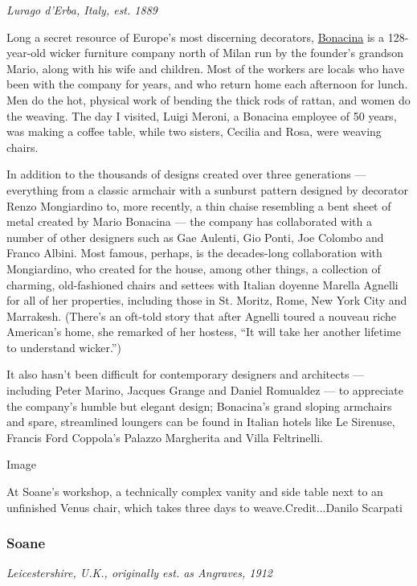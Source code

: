 \emph{Lurago d'Erba, Italy, est. 1889}

Long a secret resource of Europe's most discerning decorators,
\href{http://www.bonacina1889.it/}{Bonacina} is a 128-year-old wicker
furniture company north of Milan run by the founder's grandson Mario,
along with his wife and children. Most of the workers are locals who
have been with the company for years, and who return home each afternoon
for lunch. Men do the hot, physical work of bending the thick rods of
rattan, and women do the weaving. The day I visited, Luigi Meroni, a
Bonacina employee of 50 years, was making a coffee table, while two
sisters, Cecilia and Rosa, were weaving chairs.

In addition to the thousands of designs created over three generations
--- everything from a classic armchair with a sunburst pattern designed
by decorator Renzo Mongiardino to, more recently, a thin chaise
resembling a bent sheet of metal created by Mario Bonacina --- the
company has collaborated with a number of other designers such as Gae
Aulenti, Gio Ponti, Joe Colombo and Franco Albini. Most famous, perhaps,
is the decades-­long collaboration with Mongiardino, who created for the
house, among other things, a collection of charming, old-fashioned
chairs and settees with Italian doyenne Marella Agnelli for all of her
properties, including those in St. Moritz, Rome, New York City and
Marrakesh. (There's an oft-told story that after Agnelli toured a
nouveau riche American's home, she remarked of her hostess, ``It will
take her another lifetime to understand wicker.'')

It also hasn't been difficult for contemporary designers and architects
--- including Peter Marino, Jacques Grange and Daniel Romualdez --- to
appreciate the company's humble but elegant design; Bonacina's grand
sloping armchairs and spare, streamlined loungers can be found in
Italian hotels like Le Sirenuse, Francis Ford Coppola's Palazzo
Margherita and Villa Feltrinelli.

Image

At Soane's workshop, a technically complex vanity and side table next to
an unfinished Venus chair, which takes three days to
weave.Credit...Danilo Scarpati

\hypertarget{soane}{%
\subsubsection{Soane}\label{soane}}

\emph{Leicestershire, U.K., originally est. as Angraves, 1912}

